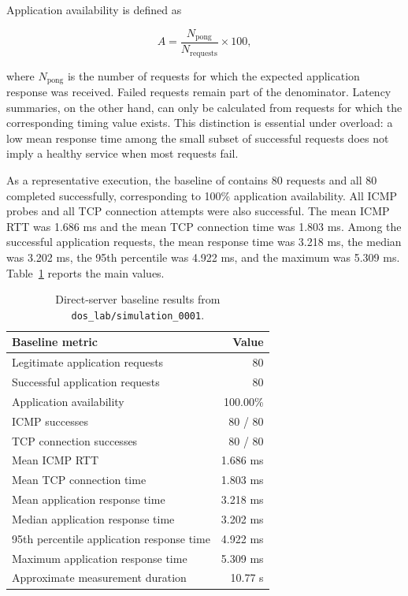 Application availability is defined as

\begin{equation}
A = \frac{N_{\mathrm{pong}}}{N_{\mathrm{requests}}} \times 100,
\label{eq:application-availability}
\end{equation}

where $N_{\mathrm{pong}}$ is the number of requests for which the expected
application response was received. Failed requests remain part of the
denominator. Latency summaries, on the other hand, can only be calculated from
requests for which the corresponding timing value exists. This distinction is
essential under overload: a low mean response time among the small subset of
successful requests does not imply a healthy service when most requests fail.

As a representative execution, the baseline of
 contains 80 requests and all 80
completed successfully, corresponding to 100\% application availability. All
ICMP probes and all TCP connection attempts were also successful. The mean
ICMP RTT was 1.686 ms and the mean TCP connection time was 1.803 ms. Among the
successful application requests, the mean response time was 3.218 ms, the
median was 3.202 ms, the 95th percentile was 4.922 ms, and the maximum was
5.309 ms. Table~\ref{tab:baseline-summary} reports the main values.

\begin{table}[htbp]
\centering
\small
\begin{tabular}{lr}
\toprule
\textbf{Baseline metric} & \textbf{Value} \\
\midrule
Legitimate application requests & 80 \\
Successful application requests & 80 \\
Application availability & 100.00\% \\
ICMP successes & 80 / 80 \\
TCP connection successes & 80 / 80 \\
Mean ICMP RTT & 1.686 ms \\
Mean TCP connection time & 1.803 ms \\
Mean application response time & 3.218 ms \\
Median application response time & 3.202 ms \\
95th percentile application response time & 4.922 ms \\
Maximum application response time & 5.309 ms \\
Approximate measurement duration & 10.77 s \\
\bottomrule
\end{tabular}
\caption{Direct-server baseline results from \texttt{dos\_lab/simulation\_0001}.}
\label{tab:baseline-summary}
\end{table}

